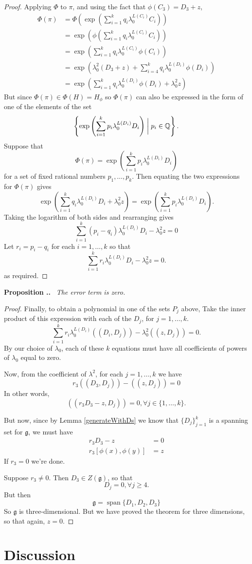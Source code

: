 \documentclass[honours]{UNSWthesis}
\newcommand{\Q}{\mathbb{Q}}
\newcommand{\g}{\mathfrak{g}}
\newcommand{\1}{\mathbf{e}_{1}}
\newcommand{\2}{\mathbf{e}_{3}}
\newcommand{\3}{\mathbf{e}_{3}}
\DeclareMathOperator{\spn}{span}
\newcounter{Item}[section]
\newenvironment{Proposition}{\medskip
                            \refstepcounter{Item}
                            \noindent
                           {\bf Proposition \thesection.\theItem.}\ %
                            \begingroup \sl}
                           {\endgroup\medskip}
\begin{document}
\begin{proof}
Applying $\Phi$ to $\pi$, and using the fact that $\phi(C_3)=D_3+z$, 
\begin{align*}
\Phi(\pi) &= \Phi \left( \exp \left( \sum\limits_{i=1}^{k}q_i \lambda_0^{L(C_i)}C_i \right)\right) \\
&= \exp \left(\phi\left(\sum\limits_{i=1}^{k}q_i \lambda_0^{L(C_i)}C_i \right)\right) \\
&= \exp \left(\sum\limits_{i=1}^{k}q_i \lambda_0^{L(C_i)}\phi(C_i) \right) \\
&=\exp \left(\lambda_0^2(D_3 + z) +\sum\limits_{i=4}^{k}q_i \lambda_0^{L(D_i)}\phi(D_i) \right) \\
&= \exp \left(\sum\limits_{i=1}^{k}q_i \lambda_0^{L(D_i)}\phi(D_i)+\lambda_0^2 z \right)
\end{align*}
But since $\Phi(\pi) \in \Phi(H)=H_{\phi}$ so $\Phi(\pi)$ can also be expressed in the form of one of the elements of the set 
\[
\left\lbrace \exp \left( \sum\limits_{i=1}^{k} p_{i}\lambda_{0}^{L(D_{i})}D_{i} \right) \biggm| p_{i} \in \Q \right\rbrace.
\]
Suppose that 
\[
\Phi(\pi)=\exp \left( \sum\limits_{i=1}^{k} p_{i}\lambda_{0}^{L(D_{i})}D_{i} \right)
\]
for a set of fixed rational numbers $p_1,\ldots,p_k$. Then equating the two expressions for $\Phi(\pi)$ gives 
\[
\exp \left(\sum\limits_{i=1}^{k}q_i \lambda_0^{L(D_i)}D_i+\lambda_0^2 z \right) =\exp \left( \sum\limits_{i=1}^{k} p_{i}\lambda_{0}^{L(D_{i})}D_{i} \right).
\]
Taking the logarithm of both sides and rearranging gives
\[
\sum\limits_{i=1}^{k}(p_i-q_i) \lambda_0^{L(D_i)}D_i-\lambda_0^2 z=0
\]
Let $r_i = p_i-q_i$ for each $i=1,\ldots,k$ so that 
\[
\sum\limits_{i=1}^{k}r_i \lambda_0^{L(D_i)}D_i-\lambda_0^2 z=0.
\]
as required. 
\end{proof}



\begin{Proposition}
The error term is zero.
\end{Proposition}
\begin{proof}
Finally, to obtain a polynomial in one of the sets $P_j$ above, Take the inner product of this expression with each of the $D_j$, for $j=1,\ldots,k$.
\[
\sum\limits_{i=1}^{k}r_i \lambda_0^{L(D_i)}((D_i,D_j))-\lambda_0^2 ((z, D_j))=0.
\]
By our choice of $\lambda_0$, each of these $k$ equations must have all coefficients of powers of $\lambda_0$ equal to zero. 

Now, from the coefficient of $\lambda^2$, for each $j=1,\ldots,k$ we have
\[
r_3 ((D_3,D_j)) -((z, D_j)) =0
\]
In other words, 
\[
((r_3 D_3 -z,D_j))=0, \forall j \in \{1,\ldots,k\}.
\]

But now, since by Lemma \ref{generateWithDs} we know that $\{D_j\}_{j=1}^{k}$ is a spanning set for $\g$, we must have 
\begin{align*}
r_3 D_3 -z&=0 \\
r_3 [\phi(x),\phi(y)]&=z
\end{align*}
If $r_3 =0$ we're done. 

Suppose $r_3 \neq 0$. Then $D_3 \in Z(\g)$, so that 
\[
D_j=0, \forall j \geq 4.
\] 
But then 
\[
\g = \spn \{ D_1,D_2,D_3 \}
\]
So $\g$ is three-dimensional. But we have proved the theorem for three dimensions, so that again, $z=0$.
\end{proof}


\chapter{Discussion}


\end{document}
